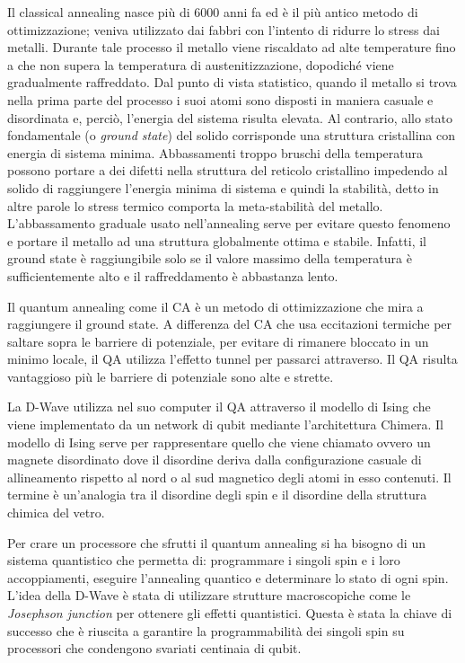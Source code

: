 \cite{QA,QVC,ST}Il classical annealing  nasce più di 6000 anni fa ed è il più antico metodo di ottimizzazione; veniva utilizzato dai fabbri con l'intento di ridurre lo stress dai metalli. Durante tale processo il metallo viene riscaldato ad alte temperature fino a che non supera la temperatura di austenitizzazione, dopodiché viene gradualmente raffreddato.
Dal punto di vista statistico, quando il metallo si trova nella prima parte del processo i suoi atomi sono disposti in maniera casuale e disordinata e, perciò, l’energia del sistema risulta elevata. Al contrario, allo stato fondamentale (o \textit{ground state}) del solido corrisponde una struttura cristallina con energia di sistema minima.
Abbassamenti troppo bruschi della temperatura possono portare a dei difetti nella struttura del reticolo cristallino impedendo al solido di raggiungere l’energia minima di sistema e quindi la stabilità, detto in altre parole lo stress termico comporta la meta-stabilità del metallo. L’abbassamento graduale usato nell’annealing serve per evitare questo fenomeno e portare il metallo ad una struttura globalmente ottima e stabile. Infatti, il ground state è raggiungibile solo se il valore massimo della temperatura è sufficientemente alto e il raffreddamento è abbastanza lento.

\cite{QVC,QAS}Il quantum annealing come il CA è un metodo di ottimizzazione che mira a raggiungere il ground state. A differenza del CA che usa eccitazioni termiche per saltare sopra le barriere di potenziale, per evitare di rimanere bloccato in un minimo locale, il QA utilizza l'effetto tunnel per passarci attraverso. Il QA risulta vantaggioso più le barriere di potenziale sono alte e strette.

La D-Wave utilizza nel suo computer il QA attraverso il modello di Ising che viene implementato da un network di qubit mediante l'architettura Chimera. Il modello di Ising serve per rappresentare quello che viene chiamato  ovvero un magnete disordinato dove il disordine deriva dalla configurazione casuale di allineamento rispetto al nord o al sud magnetico degli atomi in esso contenuti. Il termine  è un'analogia tra il disordine degli spin e il disordine della struttura chimica del vetro.

\cite{QAS,QVC}Per crare un processore che sfrutti il quantum annealing si ha bisogno di un sistema quantistico che permetta di: programmare i singoli spin e i loro accoppiamenti, eseguire l'annealing quantico e determinare lo stato di ogni spin. L'idea della D-Wave è stata di utilizzare strutture macroscopiche come le \textit{Josephson junction} per ottenere gli effetti quantistici. Questa è stata la chiave di successo che è riuscita a garantire la programmabilità dei singoli spin su processori che condengono svariati centinaia di qubit.

